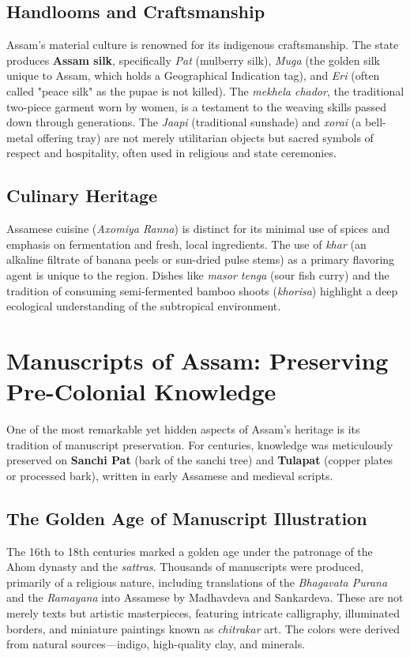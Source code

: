 \documentclass{article}
\begin{document}
\subsection{Handlooms and Craftsmanship}
Assam's material culture is renowned for its indigenous craftsmanship. The state produces \textbf{Assam silk}, specifically \textit{Pat} (mulberry silk), \textit{Muga} (the golden silk unique to Assam, which holds a Geographical Indication tag), and \textit{Eri} (often called "peace silk" as the pupae is not killed). The \textit{mekhela chador}, the traditional two-piece garment worn by women, is a testament to the weaving skills passed down through generations. The \textit{Jaapi} (traditional sunshade) and \textit{xorai} (a bell-metal offering tray) are not merely utilitarian objects but sacred symbols of respect and hospitality, often used in religious and state ceremonies.

\subsection{Culinary Heritage}
Assamese cuisine (\textit{Axomiya Ranna}) is distinct for its minimal use of spices and emphasis on fermentation and fresh, local ingredients. The use of \textit{khar} (an alkaline filtrate of banana peels or sun-dried pulse stems) as a primary flavoring agent is unique to the region. Dishes like \textit{masor tenga} (sour fish curry) and the tradition of consuming semi-fermented bamboo shoots (\textit{khorisa}) highlight a deep ecological understanding of the subtropical environment.

\section{Manuscripts of Assam: Preserving Pre-Colonial Knowledge}
One of the most remarkable yet hidden aspects of Assam's heritage is its tradition of manuscript preservation. For centuries, knowledge was meticulously preserved on \textbf{Sanchi Pat} (bark of the sanchi tree) and \textbf{Tulapat} (copper plates or processed bark), written in early Assamese and medieval scripts.

\subsection{The Golden Age of Manuscript Illustration}
The 16th to 18th centuries marked a golden age under the patronage of the Ahom dynasty and the \textit{sattras}. Thousands of manuscripts were produced, primarily of a religious nature, including translations of the \textit{Bhagavata Purana} and the \textit{Ramayana} into Assamese by Madhavdeva and Sankardeva. These are not merely texts but artistic masterpieces, featuring intricate calligraphy, illuminated borders, and miniature paintings known as \textit{chitrakar} art. The colors were derived from natural sources—indigo, high-quality clay, and minerals.
\end{document}
